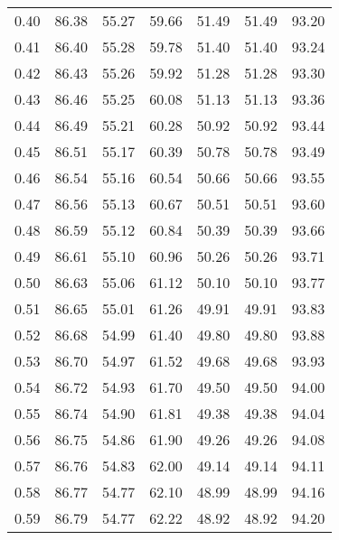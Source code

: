 \begin{tabular}{|c|c|c|c|c|c|c|}
      0.40 &     86.38 &     55.27 &      59.66 &   51.49 &      51.49 &         93.20 \\
      0.41 &     86.40 &     55.28 &      59.78 &   51.40 &      51.40 &         93.24 \\
      0.42 &     86.43 &     55.26 &      59.92 &   51.28 &      51.28 &         93.30 \\
      0.43 &     86.46 &     55.25 &      60.08 &   51.13 &      51.13 &         93.36 \\
      0.44 &     86.49 &     55.21 &      60.28 &   50.92 &      50.92 &         93.44 \\
      0.45 &     86.51 &     55.17 &      60.39 &   50.78 &      50.78 &         93.49 \\
      0.46 &     86.54 &     55.16 &      60.54 &   50.66 &      50.66 &         93.55 \\
      0.47 &     86.56 &     55.13 &      60.67 &   50.51 &      50.51 &         93.60 \\
      0.48 &     86.59 &     55.12 &      60.84 &   50.39 &      50.39 &         93.66 \\
      0.49 &     86.61 &     55.10 &      60.96 &   50.26 &      50.26 &         93.71 \\
      0.50 &     86.63 &     55.06 &      61.12 &   50.10 &      50.10 &         93.77 \\
      0.51 &     86.65 &     55.01 &      61.26 &   49.91 &      49.91 &         93.83 \\
      0.52 &     86.68 &     54.99 &      61.40 &   49.80 &      49.80 &         93.88 \\
      0.53 &     86.70 &     54.97 &      61.52 &   49.68 &      49.68 &         93.93 \\
      0.54 &     86.72 &     54.93 &      61.70 &   49.50 &      49.50 &         94.00 \\
      0.55 &     86.74 &     54.90 &      61.81 &   49.38 &      49.38 &         94.04 \\
      0.56 &     86.75 &     54.86 &      61.90 &   49.26 &      49.26 &         94.08 \\
      0.57 &     86.76 &     54.83 &      62.00 &   49.14 &      49.14 &         94.11 \\
      0.58 &     86.77 &     54.77 &      62.10 &   48.99 &      48.99 &         94.16 \\
      0.59 &     86.79 &     54.77 &      62.22 &   48.92 &      48.92 &         94.20 \\

\end{tabular}
